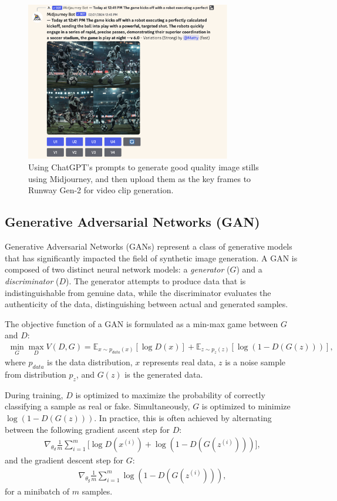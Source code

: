 \documentclass[11pt,a4paper,oneside]{report}
\begin{document}
\begin{figure}[htbp]
  \centering
  \includegraphics[width=0.8\textwidth]{mj.png}
  \caption{Using ChatGPT's prompts to generate good quality image stills using Midjourney, and then upload them as the key frames to Runway Gen-2 for video clip generation.}
\end{figure}

\subsection{Generative Adversarial Networks (GAN)}

Generative Adversarial Networks (GANs) represent a class of generative models that has significantly impacted the field of synthetic image generation. A GAN is composed of two distinct neural network models: a \textit{generator} ($G$) and a \textit{discriminator} ($D$). The generator attempts to produce data that is indistinguishable from genuine data, while the discriminator evaluates the authenticity of the data, distinguishing between actual and generated samples.

The objective function of a GAN is formulated as a min-max game between $G$ and $D$:
\begin{align}
\min_{G} \max_{D} V(D, G) = \mathbb{E}_{x\sim p_{data}(x)}[\log D(x)] + \mathbb{E}_{z\sim p_{z}(z)}[\log (1 - D(G(z)))],
\end{align}
where $p_{data}$ is the data distribution, $x$ represents real data, $z$ is a noise sample from distribution $p_z$, and $G(z)$ is the generated data.

During training, $D$ is optimized to maximize the probability of correctly classifying a sample as real or fake. Simultaneously, $G$ is optimized to minimize $\log(1 - D(G(z)))$. In practice, this is often achieved by alternating between the following gradient ascent step for $D$:
\begin{align}
\nabla_{\theta_d} \frac{1}{m} \sum_{i=1}^{m} \Big[ \log D(x^{(i)}) + \log (1 - D(G(z^{(i)}))) \Big],
\end{align}
and the gradient descent step for $G$:
\begin{align}
\nabla_{\theta_g} \frac{1}{m} \sum_{i=1}^{m} \log (1 - D(G(z^{(i)}))),
\end{align}
for a minibatch of $m$ samples.
\end{document}
